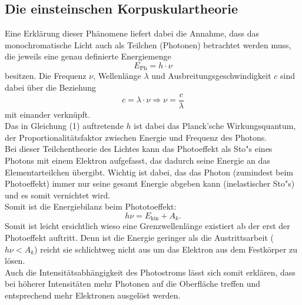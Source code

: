 \subsection{Die einsteinschen Korpuskulartheorie}
Eine Erklärung dieser Phänomene liefert dabei die Annahme, dass das monochromatische Licht auch als Teilchen (Photonen) betrachtet werden muss, 
die jeweils eine genau definierte Energiemenge
\begin{equation}
E_{\text{Ph}} = h \cdot \nu
\end{equation}
besitzen. 
Die Frequenz $\nu$, Wellenlänge $\lambda$ und Ausbreitungsgeschwindigkeit $c$ sind dabei über die Beziehung
\begin{equation}
c = \lambda \cdot \nu \Rightarrow \nu = \frac{c}{\lambda}
\end{equation}
mit einander verknüpft.\\
Das in Gleichung (1) auftretende $h$ ist dabei das Planck'sche Wirkungsquantum, 
der Proportionalitätsfaktor zwischen Energie und Frequenz des Photons.\\
Bei dieser Teilchentheorie des Lichtes kann das Photoeffekt als Sto"s eines Photons mit einem Elektron aufgefasst, 
das dadurch seine Energie an das Elementarteilchen übergibt. Wichtig ist dabei, das das Photon (zumindest beim Photoeffekt)
 immer nur seine gesamt Energie abgeben kann (inelastischer Sto"s) und es somit vernichtet wird.\\
Somit ist die Energiebilanz beim Phototoeffekt:
\begin{equation}
    h \nu  = {E}_{\text{kin}} + {A}_{k}.
\end{equation}
 Somit ist leicht ersichtlich wieso eine Grenzwellenlänge existiert ab der erst der Photoeffekt auftritt. 
 Denn ist die Energie geringer als die Austrittsarbeit (\(h\nu < A_k\)) reicht sie schlichtweg nicht aus um das Elektron aus dem Festkörper zu lösen.\\
Auch die Intensitätsabhängigkeit des Photostroms lässt sich somit erklären, dass bei höherer Intensitäten mehr Photonen 
auf die Oberfläche treffen und entsprechend mehr Elektronen ausgelöst werden.\\

\label{sec:Theorie}

